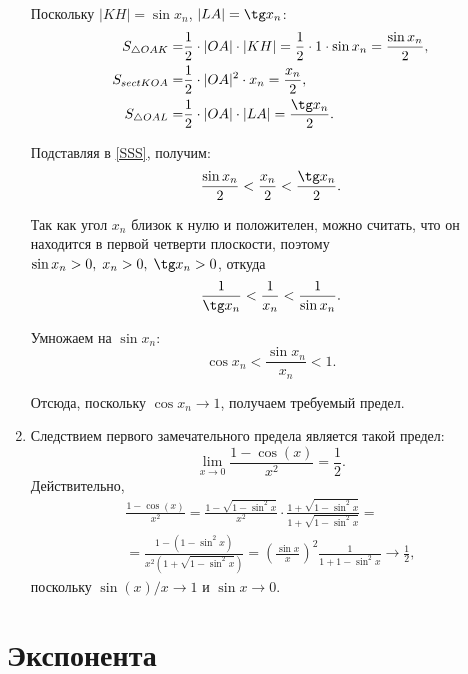 \begin{enumerate}
Поскольку $|KH| = \sin x_n$, $|LA| = \tg x_n$:
\begin{align*}
S_{\triangle OAK} = & \frac{1}{2} \cdot |OA| \cdot|KH| = \frac{1}{2} \cdot 1 \cdot \sin x_n = \frac{\sin x_n}{2}, \\
S_{sect KOA} = & \frac{1}{2} \cdot |OA|^2 \cdot x_n = \frac{x_n}{2}, \\
S_{\triangle OAL} = & \frac{1}{2} \cdot |OA| \cdot |LA| = \frac{\tg x_n}{2}.
\end{align*}

Подставляя в \eqref{SSS}, получим:
$$
\frac{\sin x_n}{2} < \frac{x_n}{2} < \frac{\tg x_n}{2}.
$$

Так как угол $x_n$ близок к нулю и положителен, можно считать, что он находится в первой четверти плоскости, поэтому
$\sin x_n > 0, \; x_n > 0, \; \tg x_n > 0$, откуда
$$
\frac{1}{\tg x_n} < \frac{1}{x_n} < \frac{1}{\sin x_n}.
$$

Умножаем на $\sin x_n$:
$$
\cos x_n < \frac{\sin x_n}{x_n} < 1.
$$

Отсюда, поскольку $\cos x_n\to 1$, получаем требуемый предел.

\item Следствием первого замечательного предела является такой предел:
$$
\lim_{x\to 0}\frac{1-\cos(x)}{x^2}=\frac 12.
$$
Действительно,
\begin{multline*}
\frac{1-\cos(x)}{x^2}=\frac{1-\sqrt{1-\sin^2 x}}{x^2}\cdot\frac{1+\sqrt{1-\sin^2 x}}{1+\sqrt{1-\sin^2 x}}=\\
=\frac{1-(1-\sin^2 x)}{x^2(1+\sqrt{1-\sin^2 x})}=\left(\frac{\sin x}{x}\right)^2\frac{1}{1+{1-\sin^2x}}\to \frac12,
\end{multline*}
поскольку $\sin(x)/x\to 1$ и $\sin x\to 0$.

\end{enumerate}



\section{Экспонента}



